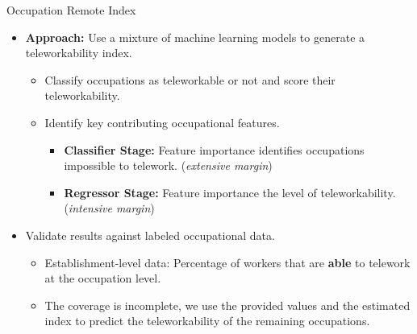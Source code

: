\documentclass[aspectratio=1610]{beamer}
\begin{document}
\begin{frame}[label=empiric_remote_index1]{Occupation Remote Index}
    \begin{itemize}
        \item \textbf{Approach:} Use a mixture of machine learning models to generate a teleworkability index. \hyperlink{appendix_remote_index_details}{}\pause \vspace{0.3cm}
        \begin{itemize}
            \item Classify occupations as teleworkable or not and score their teleworkability.
            \item Identify key contributing occupational features.\pause \vspace{0.3cm}
            \begin{itemize}
                \item \textbf{Classifier Stage:} Feature importance identifies occupations impossible to telework. (\textit{extensive margin})\hyperlink{appendix_remote_index_performance_feature_importance_classifier}{}
                \item \textbf{Regressor Stage:} Feature importance the level of teleworkability. (\textit{intensive margin})\hyperlink{appendix_remote_index_performance_feature_importance_regressor}{}
            \end{itemize}
        \end{itemize}\pause \vspace{0.3cm}
        \item Validate results against labeled occupational data. \vspace{0.3cm}
        \begin{itemize}
            \item Establishment-level data: Percentage of workers that are \textbf{able} to telework at the occupation level.
            \item The coverage is incomplete, we use the provided values and the estimated index to predict the teleworkability of the remaining occupations.
        \end{itemize}
    \end{itemize}
\end{frame}
        
\end{document}
